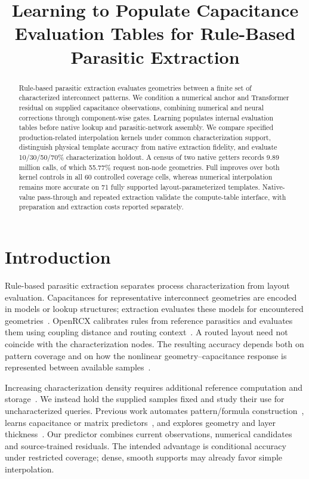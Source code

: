 \documentclass[conference,9pt,letterpaper]{IEEEtran}
\title{Learning to Populate Capacitance Evaluation Tables for Rule-Based Parasitic Extraction}
\author{\IEEEauthorblockN{Anonymous authors}\IEEEauthorblockA{\vphantom{Department and affiliation}\vphantom{City, Country}\\\vphantom{Contact information}}}
\begin{document}
\maketitle
\begin{abstract}
Rule-based parasitic extraction evaluates geometries between a finite set of characterized interconnect patterns. We condition a numerical anchor and Transformer residual on supplied capacitance observations, combining numerical and neural corrections through component-wise gates. Learning populates internal evaluation tables before native lookup and parasitic-network assembly. We compare specified production-related interpolation kernels under common characterization support, distinguish physical template accuracy from native extraction fidelity, and evaluate 10/30/50/70\% characterization holdout. A census of two native getters records 9.89 million calls, of which 55.77\% request non-node geometries. Full improves over both kernel controls in all 60 controlled coverage cells, whereas numerical interpolation remains more accurate on 71 fully supported layout-parameterized templates. Native-value pass-through and repeated extraction validate the compute-table interface, with preparation and extraction costs reported separately.
\end{abstract}

\section{Introduction}
Rule-based parasitic extraction separates process characterization from layout evaluation. Capacitances for representative interconnect geometries are encoded in models or lookup structures; extraction evaluates these models for encountered geometries~\cite{tsai,yang2023cnncap}. OpenRCX calibrates rules from reference parasitics and evaluates them using coupling distance and routing context~\cite{orcx_runtime,openrcx}. A routed layout need not coincide with the characterization nodes. The resulting accuracy depends both on pattern coverage and on how the nonlinear geometry--capacitance response is represented between available samples~\cite{zhou2026rmlpcap}.

Increasing characterization density requires additional reference computation and storage~\cite{yang2023cnncap}. We instead hold the supplied samples fixed and study their use for uncharacterized queries. Previous work automates pattern/formula construction~\cite{li2020autoprechar}, learns capacitance or matrix predictors~\cite{yang2023cnncap,zhou2026rmlpcap,attentioncap,flash}, and explores geometry and layer thickness~\cite{tsai}. Our predictor combines current observations, numerical candidates and source-trained residuals. The intended advantage is conditional accuracy under restricted coverage; dense, smooth supports may already favor simple interpolation.
\end{document}
